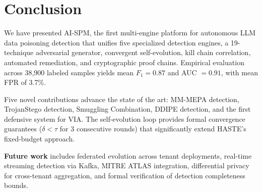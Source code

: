 \documentclass[11pt,twocolumn]{article}
\begin{document}
\section{Conclusion}
\label{sec:conclusion}

We have presented AI-SPM, the first multi-engine platform for autonomous LLM data poisoning detection that unifies five specialized detection engines, a 19-technique adversarial generator, convergent self-evolution, kill chain correlation, automated remediation, and cryptographic proof chains. Empirical evaluation across 38,900 labeled samples yields mean $F_1 = 0.87$ and AUC $= 0.91$, with mean FPR of 3.7\%.

Five novel contributions advance the state of the art: MM-MEPA detection, TrojanStego detection, Smuggling Combination, DDIPE detection, and the first defensive system for VIA. The self-evolution loop provides formal convergence guarantees ($\delta < \tau$ for 3 consecutive rounds) that significantly extend HASTE's fixed-budget approach.

\textbf{Future work} includes federated evolution across tenant deployments, real-time streaming detection via Kafka, MITRE ATLAS integration, differential privacy for cross-tenant aggregation, and formal verification of detection completeness bounds.
\end{document}
